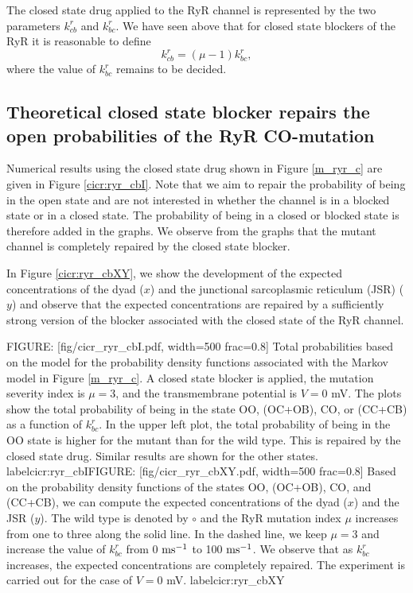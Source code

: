 The closed state drug applied to the RyR channel is represented by the two
parameters $k_{cb}^{r}$ and $k_{bc}^{r}.$ We have seen above that for closed
state blockers of the RyR it is reasonable to define
\[
k_{cb}^{r}=\left(  \mu-1\right)  k_{bc}^{r},
\]
where the value of $k_{bc}^{r}$ remains to be decided.

\subsection{Theoretical closed state blocker repairs the open probabilities of the RyR CO-mutation}

Numerical results using the closed state drug shown in Figure \ref{m_ryr_c} are given
in Figure \ref{cicr:ryr_cbI}. Note that we aim to repair the probability of being in the open state and are not interested in whether the channel is in a blocked state or in a closed state. The probability of being in a closed or blocked state is therefore
added in the graphs. We observe from the graphs that
the mutant channel is completely repaired by the closed state blocker.

In Figure \ref{cicr:ryr_cbXY}, we show the development of the expected concentrations of the dyad ($x$) and the junctional sarcoplasmic reticulum  (JSR) ($y$) and observe that
the expected concentrations are repaired by a sufficiently strong version of the blocker associated with the closed state of the RyR channel.


FIGURE: [fig/cicr_ryr_cbI.pdf, width=500 frac=0.8] Total probabilities based on the model for the probability density functions associated with the Markov model
in Figure \ref{m_ryr_c}. A closed state blocker is applied, the mutation severity index is $\mu=3$, and the transmembrane potential is $V=0$ mV.
The plots show the total probability of being in the state OO, (OC+OB), CO, or (CC+CB) as a function of
$k^r_{bc}$. In the upper left plot, the total probability of being in the OO state is higher for the mutant than for the wild type. This is repaired by the closed
state drug. Similar results are shown for the other states.  label{cicr:ryr_cbI}FIGURE: [fig/cicr_ryr_cbXY.pdf, width=500 frac=0.8] Based on the probability density functions of the states OO, (OC+OB), CO, and (CC+CB), we can compute the
expected concentrations of the dyad ($x$) and the JSR ($y$). The wild type is denoted by $\circ$ and the RyR mutation index $\mu$ increases from one to three along the solid line. In the dashed line, we keep $\mu=3$ and increase the value of $k^r_{bc}$ from 0 $\rm{ms^{-1}}$ to 100 $\rm{ms^{-1}}$. We observe that as $k^r_{bc}$  increases, the
expected concentrations are completely repaired. The experiment is carried out for the case of $V=0$ mV. label{cicr:ryr_cbXY}
